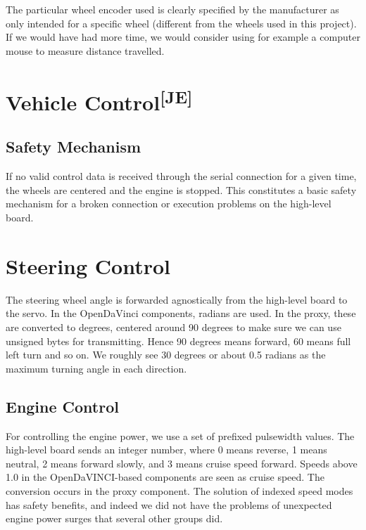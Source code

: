 \noindent
The particular wheel encoder used is clearly specified by the manufacturer as
only intended for a specific wheel (different from the wheels used in this
project). If we would have had more time, we would consider using for example a
computer mouse to measure distance travelled.

\section[Vehicle Control]{Vehicle Control\textsuperscript{[JE]}}

\subsection{Safety Mechanism}
If no valid control data is received through the serial connection for a given
time, the wheels are centered and the engine is stopped. This constitutes a
basic safety mechanism for a broken connection or execution problems on the
high-level board.

\section{Steering Control}
The steering wheel angle is forwarded agnostically from the high-level board to
the servo. In the OpenDaVinci components, radians are used. In the proxy, these
are converted to degrees, centered around 90 degrees to make sure we can use
unsigned bytes for transmitting. Hence 90 degrees means forward, 60 means full
left turn and so on. We roughly see 30 degrees or about 0.5 radians as the
maximum turning angle in each direction.

\subsection{Engine Control}
For controlling the engine power, we use a set of prefixed pulsewidth values.
The high-level board sends an integer number, where 0 means reverse, 1 means
neutral, 2 means forward slowly, and 3 means cruise speed forward. Speeds above
1.0  in the OpenDaVINCI-based components are seen as cruise speed. The
conversion occurs in the proxy component. The solution of indexed speed modes
has safety benefits, and indeed we did not have the problems of unexpected
engine power surges that several other groups did.\\

